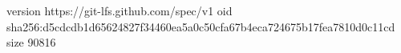 version https://git-lfs.github.com/spec/v1
oid sha256:d5cdcdb1d65624827f34460ea5a0c50cfa67b4eca724675b17fea7810d0c11cd
size 90816
